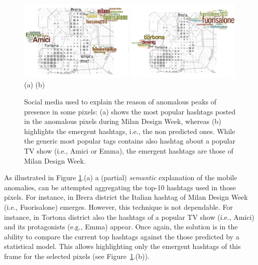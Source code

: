 \begin{figure}[t]
\begin{center}
\includegraphics[width=0.49\textwidth]{img/mdw-ht-1} 
\includegraphics[width=0.49\textwidth]{img/mdw-ht-2} 
(a)\hspace{150pt} (b)
\caption{Social media used  to explain the reason of anomalous peaks of presence  in some pixels: (a) shows the most popular hashtags posted in the anomalous pixels during Milan Design Week, whereas (b) highlights the emergent hashtags, i.e., the non predicted ones. While the generic most popular tags contains also hashtag about a popular TV show (i.e., Amici or Emma), the emergent hashtags are those of Milan Design Week.}
\label{fig:de}
\end{center}
\end{figure}

As illustrated in Figure \ref{fig:de}.(a) a (partial) \textit{semantic} explanation of the mobile anomalies, can be attempted aggregating the top-10 hashtags used in those pixels. For instance, in Brera district the Italian hashtag of Milan Design Week (i.e., Fuorisalone) emerges. However, this technique is not dependable. For instance, in Tortona district also the hashtags of a popular TV show (i.e., Amici) and its protagonists (e.g., Emma) appear. Once again, the solution is in the ability to compare the current top hashtags against the those predicted by a statistical model. This allows highlighting only the emergent hashtags of this frame for the selected pixels  (see Figure~\ref{fig:de}.(b)).

